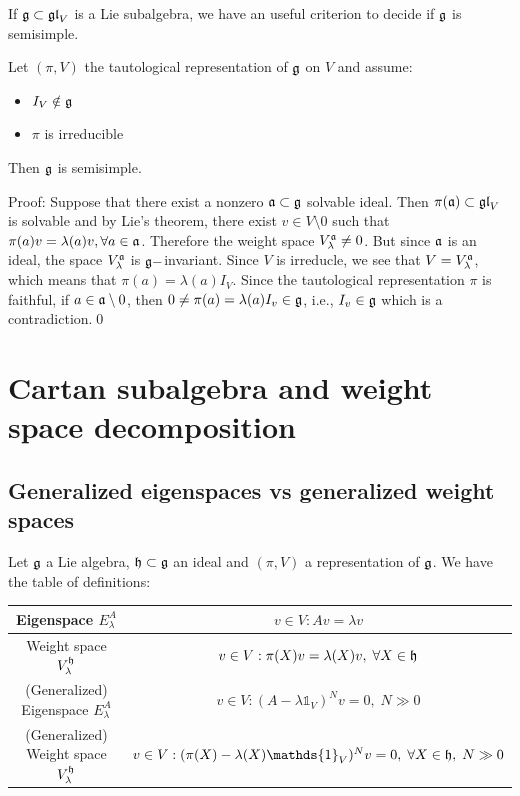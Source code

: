 If $\mathfrak{g}\subset\mathfrak{gl}_V$ is a Lie subalgebra, we have an useful criterion to decide if $\mathfrak{g}$ is semisimple.

\begin{dang}
    \begin{lemma}\label{Lemma: alternative criteria for ss Lie algebras}
        Let $(\pi,V)$ the tautological representation of $\mathfrak{g}$ on $V$ and assume: 
        \begin{itemize}
            \item[1.] $I_V\notin \mathfrak{g}$
            \item[2.] $\pi$ is irreducible
        \end{itemize}
        Then $\mathfrak{g}$ is semisimple.
    \end{lemma}
\end{dang}
Proof: Suppose that there exist a nonzero $\mathfrak{a}\subset\mathfrak{g}$ solvable ideal. 
Then $\pi(\mathfrak{a})\subset \mathfrak{gl}_V$ is solvable and 
by Lie's theorem, there exist $v\in V\setminus0$ such that $\pi(a)v=\lambda(a)v,\forall a\in\mathfrak{a}$. 
Therefore the weight space $V_\lambda^{\mathfrak{a}}\neq0$. But since $\mathfrak{a}$ is an ideal, the space 
$V_\lambda^{\mathfrak{a}}$ is $\mathfrak{g}-$invariant. Since $V$ is irreducle, we see that $V=V_\lambda^{\mathfrak{a}}$, which means 
that $\pi(a)=\lambda(a)I_V$. Since the tautological representation $\pi$ is faithful, if $a\in\mathfrak{a}\setminus0$, then 
$0\neq \pi(a)=\lambda(a)I_v\in\mathfrak{g}$, i.e., $I_v\in \mathfrak{g}$ which is a contradiction.\qed



\section{Cartan subalgebra and weight space decomposition}

\subsection{Generalized eigenspaces vs generalized weight spaces}
Let $\mathfrak{g}$ a Lie algebra, 
$\mathfrak{h}\subset\mathfrak{g}$ an ideal and $(\pi, V)$ a representation of $\mathfrak{g}$. We have the table of definitions:
\begin{center}
    \begin{tabular}{|c|c|}
        \hline
      Eigenspace $E_\lambda^A$  & $v\in V: Av=\lambda v$ \\
        \hline
      Weight space $V_\lambda^{\mathfrak{h}}$  & $v\in V: \pi(X)v=\lambda(X)v,\;\forall X\in\mathfrak{h}$\\
        \hline 
      (Generalized) Eigenspace $E_\lambda^A$  & $v\in V: (A-\lambda\mathds{1}_V)^Nv=0,\;N\gg0$ \\
        \hline
    (Generalized) Weight space $V_\lambda^{\mathfrak{h}}$  
    & $v\in V:(\pi(X)-\lambda(X)\mathds{1}_V)^Nv=0,\;\forall X\in\fr{h},\;N\gg0$\\
    \hline
    \end{tabular}
\end{center}

